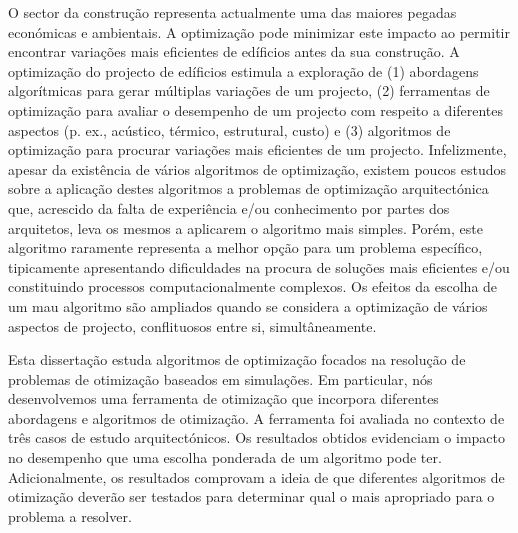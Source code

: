 \noindent 
O sector da construção representa actualmente uma das maiores pegadas económicas e ambientais. A optimização pode minimizar este impacto ao permitir encontrar variações mais eficientes de edíficios antes da sua construção. A optimização do projecto de edíficios estimula a exploração de (1) abordagens algorítmicas para gerar múltiplas variações de um projecto, (2) ferramentas de optimização para avaliar o desempenho de um projecto com respeito a diferentes aspectos (p. ex., acústico, térmico, estrutural, custo) e (3) algoritmos de optimização para procurar variações mais eficientes de um projecto. Infelizmente, apesar da existência de vários algoritmos de optimização, existem poucos estudos sobre a aplicação destes algoritmos a problemas de optimização arquitectónica que, acrescido da falta de experiência e/ou conhecimento por partes dos arquitetos, leva os mesmos a aplicarem o algoritmo mais simples. Porém, este algoritmo raramente representa a melhor opção para um problema específico, tipicamente apresentando dificuldades na procura de soluções mais eficientes e/ou constituindo processos computacionalmente complexos. Os efeitos da escolha de um mau algoritmo são ampliados quando se considera a optimização de vários aspectos de projecto, conflituosos entre si, simultâneamente.

Esta dissertação estuda algoritmos de optimização focados na resolução de problemas de otimização baseados em simulações. Em particular, nós desenvolvemos uma ferramenta de otimização que incorpora diferentes abordagens e algoritmos de otimização. A ferramenta foi avaliada no contexto de três casos de estudo arquitectónicos. Os resultados obtidos evidenciam o impacto no desempenho que uma escolha ponderada de um algoritmo pode ter. Adicionalmente, os resultados comprovam a ideia de que diferentes algoritmos de otimização deverão ser testados para determinar qual o mais apropriado para o problema a resolver.